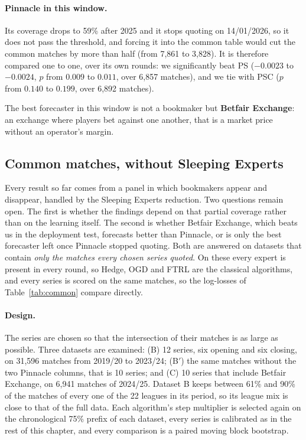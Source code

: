 \documentclass[12pt,a4paper,oneside]{report}
\renewcommand{\_}{\oldunderscore\allowbreak}
\theoremstyle{definition}
\theoremstyle{plain}
\theoremstyle{definition}   %
\begin{document}
\paragraph{Pinnacle in this window.} Its coverage drops to 59\% after 2025 and it stops quoting on
14/01/2026, so it does not pass the threshold, and forcing it into the common table would cut
the common matches by more than half (from 7,861 to 3,828). It is therefore compared one to
one, over its own rounds: we significantly beat PS ($-0.0023$ to $-0.0024$, $p$ from $0.009$ to
$0.011$, over 6,857 matches), and we tie with PSC ($p$ from $0.140$ to $0.199$, over 6,892
matches).

The best forecaster in this window is not a bookmaker but \textbf{Betfair
Exchange}: an exchange where players bet against one another, that is a market price without an
operator's margin.

\subsection{Common matches, without Sleeping Experts}
\label{sec:res-common}

Every result so far comes from a panel in which bookmakers appear and disappear, handled by the
Sleeping Experts reduction. Two questions remain open. The first is whether the findings depend
on that partial coverage rather than on the learning itself. The second is whether Betfair
Exchange, which beats us in the deployment test, forecasts better than Pinnacle, or is only the
best forecaster left once Pinnacle stopped quoting. Both are answered on datasets that contain
\emph{only the matches every chosen series quoted}. On these every expert is present in every
round, so Hedge, OGD and FTRL are the classical algorithms, and every series is scored on the
same matches, so the log-losses of Table~\ref{tab:common} compare directly.

\paragraph{Design.} The series are chosen so that the intersection of their matches is as large as
possible. Three datasets are examined: (B) 12 series, six opening and six closing, on 31,596
matches from 2019/20 to 2023/24; (B$'$) the same matches without the two Pinnacle columns, that
is 10 series; and (C) 10 series that include Betfair Exchange, on 6,941 matches of 2024/25.
Dataset B keeps between 61\% and 90\% of the matches of every one of the 22 leagues in its
period, so its league mix is close to that of the full data. Each algorithm's step multiplier is
selected again on the chronological 75\% prefix of each dataset, every series is calibrated as in
the rest of this chapter, and every comparison is a paired moving block bootstrap.
\end{document}
